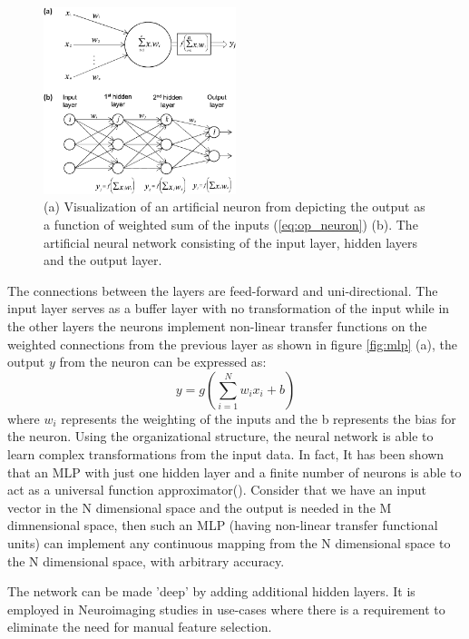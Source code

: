 \documentclass[msthesis.tex]{subfiles}
\begin{document}
\begin{figure}
    \centering
    \includegraphics[width=0.5\textwidth]{images/tnn_ann.png}
    \caption{(a) Visualization of an artificial neuron from \cite{vieira2017using} depicting the output as a function of weighted sum of the inputs (\autoref{eq:op_neuron}) (b). The artificial neural network consisting of the input layer, hidden layers and the output layer.}
    \label{fig:mlp}
\end{figure}
The connections between the layers are feed-forward and uni-directional. The input layer serves as a buffer layer with no transformation of the input while in the other layers the neurons implement non-linear transfer functions on the weighted connections from the previous layer as shown in figure \autoref{fig:mlp} (a), the output $y$ from the neuron can be expressed as:
\begin{equation}
    \label{eq:op_neuron}
    y = g(\sum_{i=1}^{N} w_i x_i +b) 
\end{equation}
where $w_i$ represents the weighting of the inputs and the b represents the bias for the neuron. Using the organizational structure, the neural network is able to learn complex transformations from the input data. In fact, It has been shown that an MLP with just one hidden layer and a finite number of neurons is able to act as a universal function approximator(\cite{universal_mlp}). Consider that we have an input vector in the N dimensional space and the output is needed in the M dimnensional space, then such an MLP (having non-linear transfer functional units) can implement any continuous mapping from the N dimensional space to the N dimensional space, with arbitrary accuracy. 

The network can be made 'deep' by adding additional hidden layers. It is employed in Neuroimaging studies in use-cases where there is a requirement to eliminate the need for manual feature selection.
\end{document}
